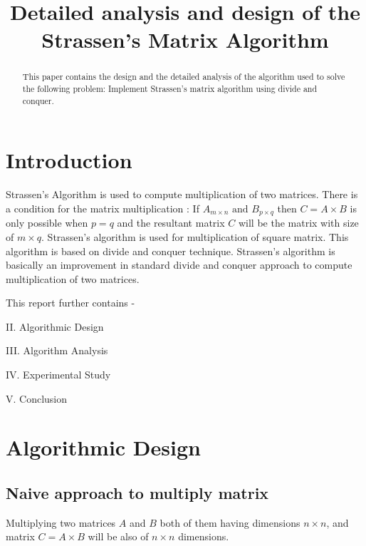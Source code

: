 \documentclass[conference]{IEEEtran}
\begin{document}
\title{Detailed analysis and design of the Strassen’s Matrix Algorithm\\

}

\author{
\and
{}
\and
{}
}

\maketitle

\begin{abstract}
This paper contains the design and the detailed analysis of the algorithm used to solve the following problem: Implement Strassen’s matrix algorithm using divide and
conquer.
\end{abstract}
\section{Introduction}
Strassen's Algorithm is used to compute multiplication of two matrices. There is a condition for the matrix multiplication :
If $A_{m\times n} \text{ and } B_{p\times q}$ then $C = A\times B$ is only possible when $p=q$ and the resultant matrix $C$ will be the matrix with size of $m\times q$. Strassen's algorithm is used for multiplication of square matrix. This algorithm is based on divide and conquer technique. Strassen's algorithm is basically an improvement in standard divide and conquer approach to compute multiplication of two matrices.

This report further contains -

II. Algorithmic Design

III. Algorithm Analysis

IV. Experimental Study

V. Conclusion 

\section{Algorithmic Design}

\subsection{Naive approach to multiply matrix}

Multiplying two matrices $A$ and $B$ both of them having dimensions $n\times n$, and matrix $C = A\times B$ will be also of $n\times n$ dimensions.
\end{document}
